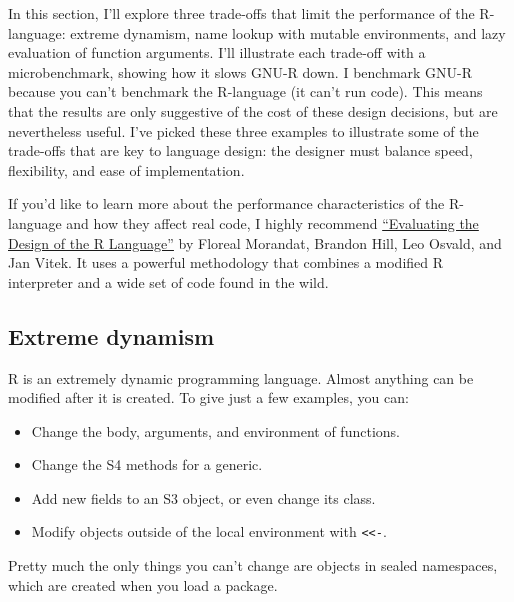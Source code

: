 
In this section, I'll explore three trade-offs that limit the
performance of the R-language: extreme dynamism, name lookup with
mutable environments, and lazy evaluation of function arguments. I'll
illustrate each trade-off with a microbenchmark, showing how it slows
GNU-R down. I benchmark GNU-R because you can't benchmark the R-language
(it can't run code). This means that the results are only suggestive of
the cost of these design decisions, but are nevertheless useful. I've
picked these three examples to illustrate some of the trade-offs that
are key to language design: the designer must balance speed,
flexibility, and ease of implementation.

If you'd like to learn more about the performance characteristics of the
R-language and how they affect real code, I highly recommend
\href{https://www.cs.purdue.edu/homes/jv/pubs/ecoop12.pdf}{``Evaluating
the Design of the R Language''} by Floreal Morandat, Brandon Hill, Leo
Osvald, and Jan Vitek. It uses a powerful methodology that combines a
modified R interpreter and a wide set of code found in the wild.

\subsection{Extreme dynamism}\label{extreme-dynamism}

R is an extremely dynamic programming language. Almost anything can be
modified after it is created. To give just a few examples, you can:

\begin{itemize}
\itemsep1pt\parskip0pt
\item
  Change the body, arguments, and environment of functions.
\item
  Change the S4 methods for a generic.
\item
  Add new fields to an S3 object, or even change its class.
\item
  Modify objects outside of the local environment with
  \texttt{\textless{}\textless{}-}.
\end{itemize}

Pretty much the only things you can't change are objects in sealed
namespaces, which are created when you load a package.

